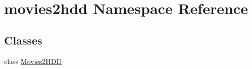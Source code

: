 \hypertarget{namespacemovies2hdd}{\section{movies2hdd Namespace Reference}
\label{namespacemovies2hdd}
}
\subsection*{Classes}
\begin{DoxyCompactItemize}
\item 
class \hyperlink{classmovies2hdd_1_1_movies2_h_d_d}{Movies2\-H\-D\-D}
\end{DoxyCompactItemize}
